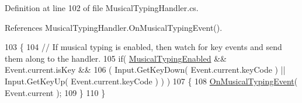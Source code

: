 Definition at line 102 of file Musical\+Typing\+Handler.\+cs.



References Musical\+Typing\+Handler.\+On\+Musical\+Typing\+Event().


\begin{DoxyCode}
103     \{
104         \textcolor{comment}{// If musical typing is enabled, then watch for key events and send them along to the handler.}
105         \textcolor{keywordflow}{if}( \hyperlink{group___mus_typ_pub_var_ga09a764161d537b31fac1a64ee5d39625}{MusicalTypingEnabled} && Event.current.isKey &&
106             ( Input.GetKeyDown( Event.current.keyCode ) || Input.GetKeyUp( Event.current.keyCode ) ) )
107         \{
108             \hyperlink{group___mus_typ_handlers_ga391a3d207136b7eb0e734e289b520188}{OnMusicalTypingEvent}( Event.current );
109         \}
110     \}
\end{DoxyCode}
